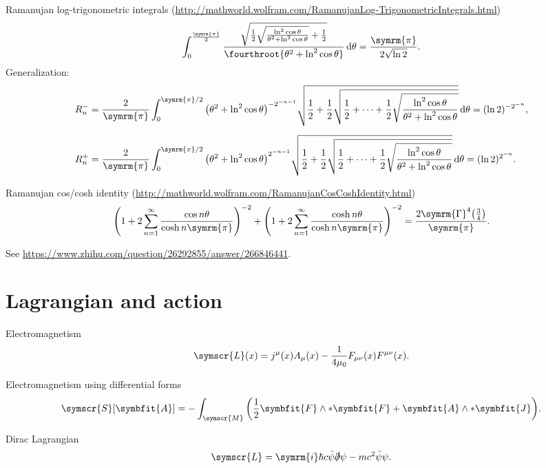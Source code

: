 \documentclass{article}
\def\bm#1{\symbfit{#1}}
\def\ii{\symrm{i}}
\def\pp{\symrm{\pi}}
\def\EulerGamma{\symrm{\Gamma}}
\def\lagL{\symscr{L}}
\def\actS{\symscr{S}}
\def\maniM{\symscr{M}}
\def\hodge{\ast} %
\def\fhalf{\frac{1}{2}}
\begin{document}
Ramanujan log-trigonometric integrals
(\url{http://mathworld.wolfram.com/RamanujanLog-TrigonometricIntegrals.html})
\begin{equation}
  \int_0^{\frac{\pp}{2}}
    \frac{\sqrt{\fhalf \sqrt{\frac{\ln^2\cos\theta}{\theta^2+\ln^2\cos\theta}} + \fhalf}}%
         {\fourthroot{\theta^2 + \ln^2\cos\theta}} \dd{\theta}
  = \frac{\pp}{2\sqrt{\ln 2}}.
\end{equation}
Generalization:
\begin{align}
  R_n^- &= \frac{2}{\pp} \int_0^{\pp/2} \qty(\theta^2+\ln^2\cos\theta)^{-2^{-n-1}}
           \sqrt{\fhalf+\fhalf\sqrt{\fhalf+\cdots+\fhalf\sqrt{
                                    \frac{\ln^2\cos\theta}{\theta^2+\ln^2\cos\theta}}}} \dd{\theta}
         = (\ln 2)^{-2^{-n}}, \\[1.2ex]
  R_n^+ &= \frac{2}{\pp} \int_0^{\pp/2} \qty(\theta^2+\ln^2\cos\theta)^{2^{-n-1}}
           \sqrt{\fhalf+\fhalf\sqrt{\fhalf+\cdots+\fhalf\sqrt{
                                    \frac{\ln^2\cos\theta}{\theta^2+\ln^2\cos\theta}}}} \dd{\theta}
         = (\ln 2)^{2^{-n}}.
\end{align}

Ramanujan cos/cosh identity (\url{http://mathworld.wolfram.com/RamanujanCosCoshIdentity.html})
\begin{equation}
    \qty(1+2\sum_{n=1}^\infty \frac{\cos  n\theta}{\cosh n\pp})^{-2}
  + \qty(1+2\sum_{n=1}^\infty \frac{\cosh n\theta}{\cosh n\pp})^{-2}
  = \frac{2\EulerGamma^4\qty(\frac{3}{4})}{\pp}.
\end{equation}

See \url{https://www.zhihu.com/question/26292855/answer/266846441}.

\section{Lagrangian and action}

Electromagnetism
\begin{equation}
  \lagL(x) = j^\mu(x) A_\mu(x) - \frac{1}{4\mu_0} F_{\mu\nu}(x) F^{\mu\nu}(x).
\end{equation}

Electromagnetism using differential forms
\begin{equation}
  \actS[\bm{A}] = -\int_{\maniM} \qty(\fhalf\bm{F}\wedge\hodge\bm{F} + \bm{A}\wedge\hodge\bm{J}).
\end{equation}

Dirac Lagrangian
\begin{equation}
  \lagL = \ii\hbar c\bar{\psi}\slashed{\partial}\psi - mc^2\bar{\psi}\psi.
\end{equation}
\end{document}
